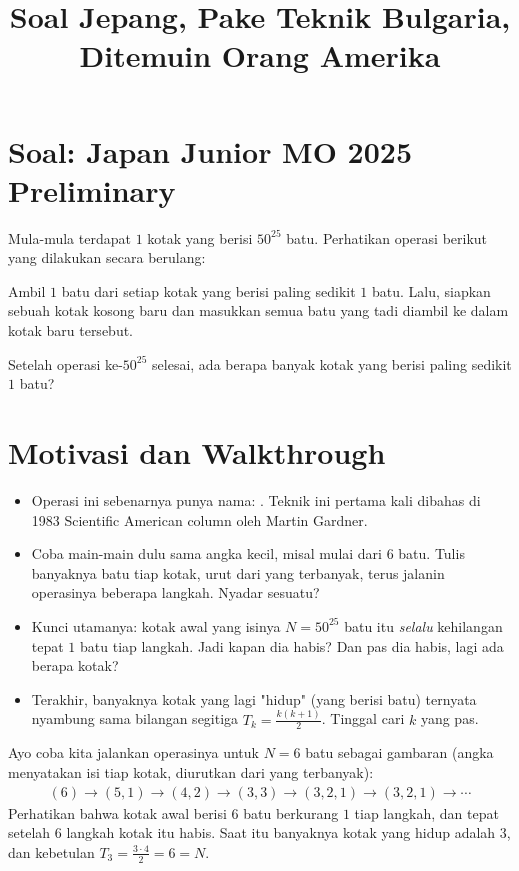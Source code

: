     \title{\color{crimson}\textbf{\Huge Soal Jepang, Pake Teknik Bulgaria, Ditemuin Orang Amerika}}
    \maketitle

\section{Soal: Japan Junior MO 2025 Preliminary}
Mula-mula terdapat $1$ kotak yang berisi $50^{25}$ batu. Perhatikan operasi berikut yang dilakukan secara berulang:

Ambil $1$ batu dari setiap kotak yang berisi paling sedikit $1$ batu. Lalu, siapkan sebuah kotak kosong baru dan masukkan semua batu yang tadi diambil ke dalam kotak baru tersebut.

Setelah operasi ke-$50^{25}$ selesai, ada berapa banyak kotak yang berisi paling sedikit $1$ batu?


\newpage
\section{Motivasi dan Walkthrough}

    \begin{itemize}
        \item Operasi ini sebenarnya punya nama: . Teknik ini pertama kali dibahas di 1983 Scientific American column oleh Martin Gardner.
        \item Coba main-main dulu sama angka kecil, misal mulai dari $6$ batu. Tulis banyaknya batu tiap kotak, urut dari yang terbanyak, terus jalanin operasinya beberapa langkah. Nyadar sesuatu?
        \item Kunci utamanya: kotak awal yang isinya $N=50^{25}$ batu itu \emph{selalu} kehilangan tepat $1$ batu tiap langkah. Jadi kapan dia habis? Dan pas dia habis, lagi ada berapa kotak?
        \item Terakhir, banyaknya kotak yang lagi "hidup" (yang berisi batu) ternyata nyambung sama bilangan segitiga $T_k = \tfrac{k(k+1)}{2}$. Tinggal cari $k$ yang pas.
    \end{itemize}


Ayo coba kita jalankan operasinya untuk $N=6$ batu sebagai gambaran (angka menyatakan isi tiap kotak, diurutkan dari yang terbanyak):
\begin{align*}
    (6) \to (5,1) \to (4,2) \to (3,3) \to (3,2,1) \to (3,2,1) \to \cdots
\end{align*}
Perhatikan bahwa kotak awal berisi $6$ batu berkurang $1$ tiap langkah, dan tepat setelah $6$ langkah kotak itu habis. Saat itu banyaknya kotak yang hidup adalah $3$, dan kebetulan $T_3 = \tfrac{3\cdot 4}{2} = 6 = N$.

